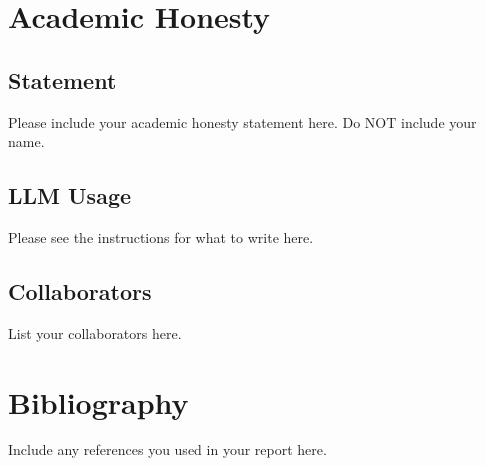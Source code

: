 \documentclass[10pt,letterpaper]{article}
\begin{document}
\section{Academic Honesty}\label{academic-integrity-statement}
\subsection{Statement}
Please include your academic honesty statement here. Do NOT include your name.
\subsection{LLM Usage}
Please see the instructions for what to write here.
\subsection{Collaborators}
List your collaborators here.
\section{Bibliography}
Include any references you used in your report here.
\end{document}
